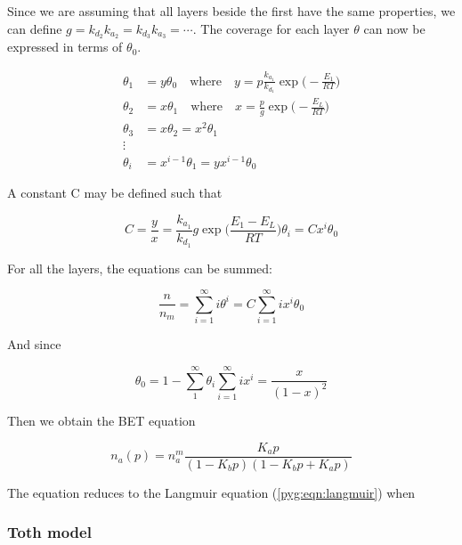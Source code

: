 Since we are assuming that all layers beside the first have the same properties,
we can define \(g= {k_{d_2}}{k_{a_2}} = {k_{d_3}}{k_{a_3}} = \cdots\).
The coverage for each layer \(\theta\) can now be expressed in terms of \(\theta_0\).

\begin{align}
    \theta_1 &= y \theta_0 \quad \text{where} \quad y = p \frac{k_{a_1}}{k_{d_1}} \exp{\Big(-\frac{E_1}{RT}\Big)} \\
    \theta_2 &= x \theta_1 \quad \text{where} \quad x = \frac{p}{g} \exp{\Big(-\frac{E_L}{RT}\Big)} \\
    \theta_3 &= x \theta_2 = x^2 \theta_1 \\
    \vdots \nonumber \\
    \theta_i &= x^{i-1} \theta_1 = y x^{i-1} \theta_0
\end{align}

A constant C may be defined such that

\begin{equation}
    C = \frac{y}{x} = \frac{k_{a_1}}{k_{d_1}} g \exp{\Big(\frac{E_1 - E_L}{RT}\Big)}
    \theta_i = C x^i \theta_0
\end{equation}

For all the layers, the equations can be summed:

\begin{equation}
    \frac{n}{n_m} = \sum_{i=1}^{\infty} i \theta^i = C \sum_{i=1}^{\infty} i x^i \theta_0
\end{equation}

And since

\begin{equation}
    \theta_0 = 1 - \sum_{1}^{\infty} \theta_i
    \sum_{i=1}^{\infty} i x^i = \frac{x}{(1-x)^2}
\end{equation}

Then we obtain the BET equation 

\begin{equation}\label{pyg:eqn:bet}
    n_a(p) = n_a^m \frac{K_a p}{(1-K_b p)(1-K_b p+ K_a p)}
\end{equation}

The equation reduces to the Langmuir equation (\ref{pyg:eqn:langmuir}) when

\subsubsection{Toth model}\label{pyg:models:toth}

